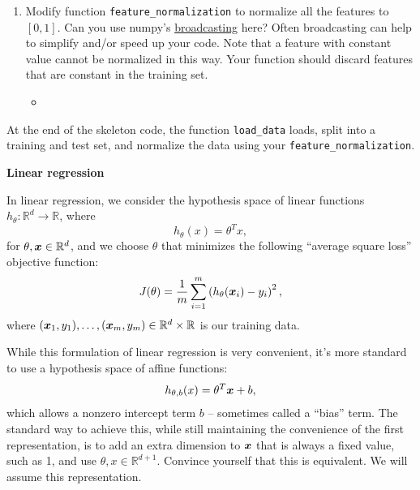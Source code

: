 \documentclass{article}
\newcommand{\nyuparagrah}[1]{\textcolor{nyupurple}{\large #1}}
\begin{document}
\begin{enumerate}
\setcounter{enumi}{\value{saveenum}}
    \item Modify function \texttt{feature\_normalization} to normalize all the
features to $[0,1]$. Can you use numpy's \href{https://docs.scipy.org/doc/numpy/user/basics.broadcasting.html}{broadcasting} here? Often broadcasting can help to simplify and/or speed up your code. Note that a feature with constant value cannot be normalized in
this way. Your function should discard features that are constant
in the training set.
\begin{itemize}
    \item \inputminted[firstline=13, lastline=34, breaklines=True]{python}{HW_2.PY.py}
\end{itemize}

\setcounter{saveenum}{\value{enumi}}
\end{enumerate}

At the end of the skeleton code, the function \texttt{load\_data} loads, split into a training and test set, and normalize the data using your \texttt{feature\_normalization}.

\nyuparagrah{\bf Linear regression}

In linear regression, we consider the hypothesis space of linear functions
$h_{\theta}:\mathbb{R}^{d}\to\mathbb{R}$, where
\[
h_{\theta}(x)=\theta^{T}x,
\]
for $\theta,\boldsymbol{x}\in\mathbb{R}^{d}$, and we choose $\theta$ that minimizes
the following ``average square loss'' objective function: 
\[
J(\theta)=\frac{1}{m}\sum_{i=1}^{m}\left(h_{\theta}(\boldsymbol{x}_{i})-y_{i}\right)^{2},
\]
where $(\boldsymbol{x}_{1},y_{1}),\ldots,(\boldsymbol{x}_{m},y_{m})\in\mathbb{R}^{d}\times\mathbb{R}$
is our training data.

While this formulation of linear regression is very convenient, it's
more standard to use a hypothesis space of affine functions:
\[
h_{\theta,b}(x)=\theta^{T} \boldsymbol{x}+b,
\]
which allows a nonzero intercept term $b$ -- sometimes called a ``bias'' term. The standard
way to achieve this, while still maintaining the convenience of the
first representation, is to add an extra dimension to $\boldsymbol{x}$ that is
always a fixed value, such as 1, and use $\theta,x\in\mathbb{R}^{d+1}$. Convince yourself that
this is equivalent. 
We will assume this representation. 
\end{document}
